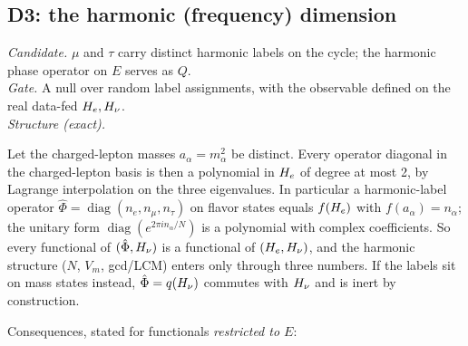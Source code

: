 \subsection{D3: the harmonic (frequency) dimension}\label{sec:D3}
\emph{Candidate.} $\mu$ and $\tau$ carry distinct harmonic labels on the cycle; the harmonic
phase operator on $E$ serves as $Q$.\\
\emph{Gate.} A null over random label assignments, with the observable defined on the real
data-fed $H_e,H_\nu$.\\
\emph{Structure (exact).}
\begin{remark}\label{rem:labels}
Let the charged-lepton masses $a_\alpha=m_\alpha^2$ be distinct. Every operator diagonal in the
charged-lepton basis is then a polynomial in $H_e$ of degree at most 2, by Lagrange interpolation on
the three eigenvalues. In particular a harmonic-label operator
$\hat\Phi=\operatorname{diag}(n_e,n_\mu,n_\tau)$ on flavor states equals $f(H_e)$ with
$f(a_\alpha)=n_\alpha$; the unitary form $\operatorname{diag}(e^{2\pi i n_\alpha/N})$ is a polynomial
with complex coefficients. So every functional of $(\hat\Phi,H_\nu)$ is a functional of
$(H_e,H_\nu)$, and the harmonic structure ($N$, $V_m$, gcd/LCM) enters only through three numbers.
If the labels sit on mass states instead, $\hat\Phi=q(H_\nu)$ commutes with $H_\nu$ and is inert by
construction.
\end{remark}
\noindent Consequences, stated for functionals \emph{restricted to $E$}:
